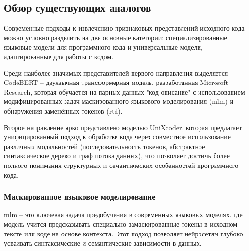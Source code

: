 \documentclass[../part_1.tex]{subfiles}
\begin{document}
\subsection{Обзор существующих аналогов}
\par Современные подходы к извлечению признаковых представлений исходного кода можно условно разделить на две основные категории: специализированные языковые модели для программного кода и универсальные модели, адаптированные для работы с кодом. 
\par Среди наиболее значимых представителей первого направления выделяется CodeBERT\cite{feng2020codebertpretrainedmodelprogramming} -- двуязычная трансформерная модель, разработанная Microsoft Research, которая обучается на парных данных "код-описание" с использованием модифицированных задач маскированного языкового моделирования (\acrshort{mlm}) и обнаружения заменённых токенов (\acrshort{rtd}). 
\par Второе направление ярко представлено моделью UniXcoder\cite{guo2022unixcoder}, которая предлагает унифицированный подход к обработке кода через совместное использование различных модальностей (последовательность токенов, абстрактное синтаксическое дерево и граф потока данных), что позволяет достичь более полного понимания структурных и семантических особенностей программного кода.

\subsubsection{Маскированное языковое моделирование}
\par \acrfull{mlm} -- это ключевая задача предобучения в современных языковых моделях, где модель учится предсказывать специально замаскированные токены в исходном тексте или коде на основе контекста. Этот подход позволяет нейросетям глубоко усваивать синтаксические и семантические зависимости в данных.
\end{document}
